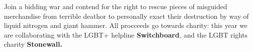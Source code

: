 Join a bidding war and contend for the right to rescue pieces of
misguided merchandise from terrible death\textemdash or to
personally exact their destruction by way of liquid nitrogen and giant
hammer. All procceeds go towards charity: this year we are
collaborating with the LGBT+ helpline
\textbf{Switchboard}, and the LGBT rights charity \textbf{Stonewall.}
